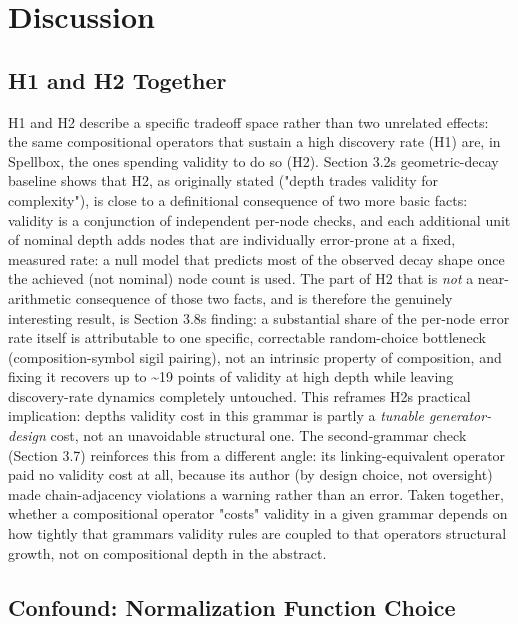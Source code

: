 \documentclass[
  10pt,
  twocolumn]{article}
\begin{document}
\section{Discussion}\label{discussion}

\subsection{H1 and H2 Together}\label{h1-and-h2-together}

H1 and H2 describe a specific tradeoff space rather than two unrelated
effects: the same compositional operators that sustain a high discovery
rate (H1) are, in Spellbox, the ones spending validity to do so (H2).
Section 3.2\textquotesingle s geometric-decay baseline shows that H2, as
originally stated ("depth trades validity for complexity"), is close to
a definitional consequence of two more basic facts: validity is a
conjunction of independent per-node checks, and each additional unit of
nominal depth adds nodes that are individually error-prone at a fixed,
measured rate: a null model that predicts most of the observed decay
shape once the achieved (not nominal) node count is used. The part of H2
that is \emph{not} a near-arithmetic consequence of those two facts, and
is therefore the genuinely interesting result, is Section
3.8\textquotesingle s finding: a substantial share of the per-node error
rate itself is attributable to one specific, correctable random-choice
bottleneck (composition-symbol sigil pairing), not an intrinsic property
of composition, and fixing it recovers up to \textasciitilde19 points of
validity at high depth while leaving discovery-rate dynamics completely
untouched. This reframes H2\textquotesingle s practical implication:
depth\textquotesingle s validity cost in this grammar is partly a
\emph{tunable generator-design} cost, not an unavoidable structural one.
The second-grammar check (Section 3.7) reinforces this from a different
angle: its linking-equivalent operator paid no validity cost at all,
because its author (by design choice, not oversight) made
chain-adjacency violations a warning rather than an error. Taken
together, whether a compositional operator "costs" validity in a given
grammar depends on how tightly that grammar\textquotesingle s validity
rules are coupled to that operator\textquotesingle s structural growth,
not on compositional depth in the abstract.

\subsection{Confound: Normalization Function
Choice}\label{confound-normalization-function-choice}
\end{document}
